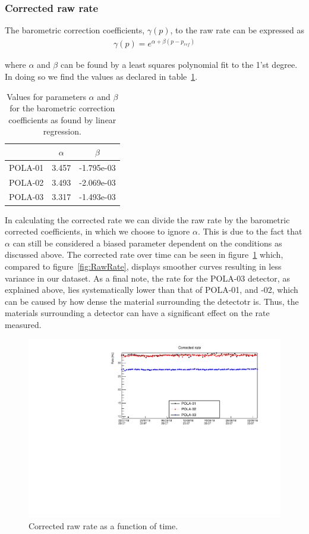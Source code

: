 \documentclass[12pt,a4paper]{amsart}
\begin{document}
\subsubsection{Corrected raw rate}
The barometric correction coefficients, $\gamma(p)$, to the raw rate can be expressed as
\begin{align}
\gamma(p) = e^{\alpha + \beta(p-p_{ref})}
\end{align}

where $\alpha$ and $\beta$ can be found by a least squares polynomial fit to the 1'st degree. In doing so we find the values as declared in table~\ref{tab:alpha_beta}.

\begin{table}[]
\caption{Values for parameters $\alpha$ and $\beta$ for the barometric correction coefficients as found by linear regression.}
\label{tab:alpha_beta}
\begin{tabular}{c|cc}
\hline\hline
        & $\alpha$ & $\beta$    \\ \hline
POLA-01 & 3.457    & -1.795e-03 \\
POLA-02 & 3.493    & -2.069e-03 \\
POLA-03 & 3.317    & -1.493e-03 \\
\hline\hline
\end{tabular}
\end{table}

In calculating the corrected rate we can divide the raw rate by the barometric corrected coefficients, in which we choose to ignore $\alpha$. This is due to the fact that $\alpha$ can still be considered a biased parameter dependent on the conditions as discussed above. The corrected rate over time can be seen in figure~\ref{fig:CorrectedRate} which, compared to figure~\ref{fig:RawRate}, displays smoother curves resulting in less variance in our dataset. As a final note, the rate for the POLA-03 detector, as explained above, lies systematically lower than that of POLA-01, and -02, which can be caused by how dense the material surrounding the detectotr is. Thus, the materials surrounding a detector can have a significant effect on the rate measured.

\begin{figure}
\centering
\includegraphics[width = \textwidth]{../data/plots/CorrectedRate_all.pdf}
\caption{Corrected raw rate as a function of time.}
\label{fig:CorrectedRate}
\end{figure}


\printbibliography
\end{document}

